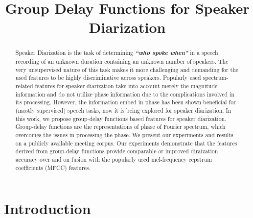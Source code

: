 \documentclass[conference]{IEEEtran}
\begin{document}
\title{Group Delay Functions for Speaker Diarization}

\author{
}

\maketitle


\begin{abstract}

Speaker Diarization is the task of determining {\bf\textit{``who spoke when"}}
in a speech recording of an unknown duration containing an unknown number of
speakers. The very unsupervised nature of this task makes it more challenging
and demanding for the used features to be highly discriminative across speakers.
Popularly used spectrum-related features for speaker diarization take into
account merely the magnitude information and do not utilize phase information
due to the complications involved in its processing. However, the information
embed in phase has been shown beneficial for (mostly supervised) speech tasks,
now it is being explored for speaker diarization. In this work, we propose
group-delay functions based features for speaker diarization. Group-delay
functions are the representations of phase of Fourier spectrum, which overcomes
the issues in processing the phase. We present our experiments and results on a
publicly available meeting corpus. Our experiments demonstrate that the features
derived from group-delay functions provide comparable or improved diraization
accuracy over and on fusion with the popularly used mel-frequency cepstrum
coefficients (MFCC) features. \\

\end{abstract}
\IEEEpeerreviewmaketitle



\section{Introduction}
\label{intro}
\end{document}
